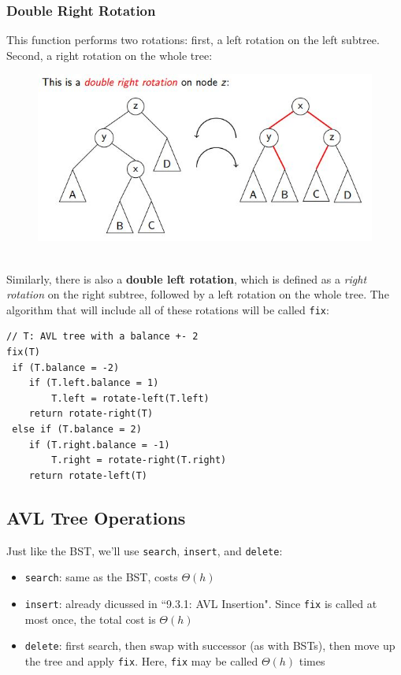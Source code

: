 \documentclass{report}
\begin{document}
\subsubsection{Double Right Rotation}
This function performs two rotations: first, a left rotation on the left subtree. Second, a right rotation on the whole tree:
\begin{figure}[ht]
\begin{center}
\includegraphics[scale=0.6]{double_right_rotation.jpg}
\end{center}
\end{figure}\\
Similarly, there is also a \textbf{double left rotation}, which is defined as a \textit{right rotation} on the right subtree, followed by a left rotation on the whole tree. The algorithm that will include all of these rotations will be called \texttt{fix}:
\begin{lstlisting}
// T: AVL tree with a balance +- 2
fix(T)
 if (T.balance = -2)
 	if (T.left.balance = 1)
 		T.left = rotate-left(T.left)
 	return rotate-right(T)
 else if (T.balance = 2)
 	if (T.right.balance = -1)
 		T.right = rotate-right(T.right)
 	return rotate-left(T)
\end{lstlisting}
\subsection{AVL Tree Operations}
Just like the BST, we'll use \texttt{search}, \texttt{insert}, and \texttt{delete}:
\begin{itemize}
\item \texttt{search}: same as the BST, costs $\Theta(h)$
\item \texttt{insert}: already dicussed in ``9.3.1: AVL Insertion". Since \texttt{fix} is called at most once, the total cost is $\Theta(h)$
\item \texttt{delete}: first search, then swap with successor (as with BSTs), then move up the tree and apply \texttt{fix}. Here, \texttt{fix} may be called $\Theta(h)$ times
\end{itemize}

\end{document}

